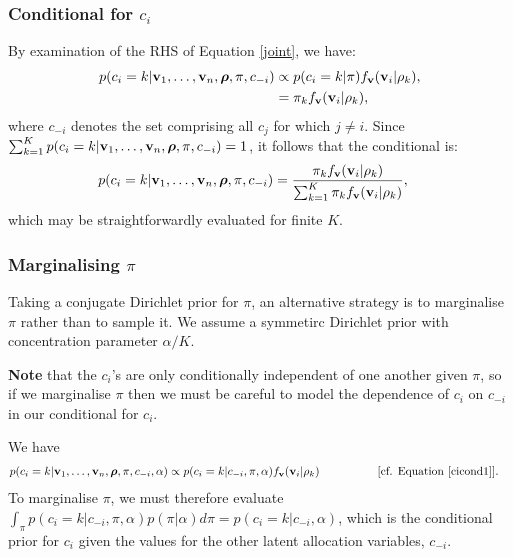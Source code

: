 \documentclass[fleqn,11pt]{wlscirep}
\begin{document}
\subsubsection{Conditional for $c_i$}
  By examination of the RHS of Equation \ref{joint}, we have:
\begin{align}
p(c_i = k| {\bf v}_1,\ldots, {\bf v}_n,\boldsymbol{\rho}, \pi, c_{-i}) &\propto p(c_i=k|\pi) f_{\bf v}({\bf v}_i | \rho_{k}),\label{cicond1}\\
&= \pi_k  f_{\bf v}({\bf v}_i | \rho_{k}),
\end{align}
where $c_{-i}$ denotes the set comprising all $c_{j}$ for which $j\ne i$.  Since $\sum_{k = 1}^K p(c_i = k| {\bf v}_1,\ldots, {\bf v}_n,\boldsymbol{\rho}, \pi, c_{-i}) = 1$, it follows that the conditional is:  
\begin{align}
p(c_i = k| {\bf v}_1,\ldots, {\bf v}_n,\boldsymbol{\rho}, \pi, c_{-i}) &= \frac{\pi_k  f_{\bf v}({\bf v}_i | \rho_{k})}{\sum_{k=1}^K \pi_k  f_{\bf v}({\bf v}_i | \rho_{k})},
\end{align}
which may be straightforwardly evaluated for finite $K$.
\subsubsection{Marginalising $\pi$}
Taking a conjugate Dirichlet prior for $\pi$, an alternative strategy is to marginalise $\pi$ rather than to sample it.  We assume a symmetirc Dirichlet prior with concentration parameter $\alpha/K$.  

{\bf Note} that the $c_i$'s are only conditionally independent of one another given $\pi$, so if we marginalise $\pi$ then we must be careful to model the dependence of $c_i$ on $c_{-i}$ in our conditional for $c_i$. 

We have    
\begin{align}
p(c_i = k| {\bf v}_1,\ldots, {\bf v}_n,\boldsymbol{\rho}, \pi, c_{-i}, \alpha) &\propto p(c_i=k|c_{-i}, \pi, \alpha) f_{\bf v}({\bf v}_i | \rho_k) \mbox{\quad\quad\quad\quad\quad [cf. Equation \eqref{cicond1}]}.%
\end{align}
To marginalise $\pi$, we must therefore evaluate $\int_\pi p(c_i=k|c_{-i}, \pi, \alpha) p(\pi|\alpha)d\pi = p(c_i=k|c_{-i}, \alpha)$, which is the conditional prior for $c_i$ given the values for the other latent allocation variables, $c_{-i}$.  
\end{document}
